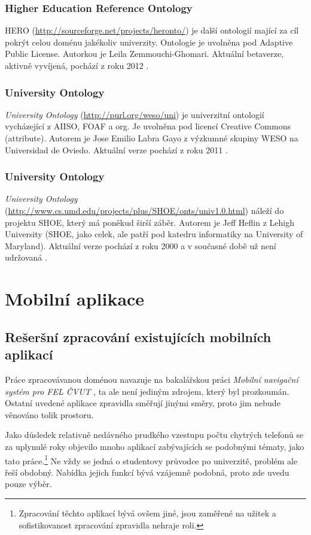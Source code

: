 \subsubsection{Higher Education Reference Ontology}
\Gls{HERO} (\url{http://sourceforge.net/projects/heronto/}) je další ontologií mající za cíl pokrýt celou doménu jakékoliv univerzity. Ontologie je uvolněna pod Adaptive Public License. Autorkou je Leila Zemmouchi-Ghomari. Aktuální betaverze, aktivně vyvíjená, pochází z roku 2012 \cite{Hero}.

\subsubsection{University Ontology}
\emph{University Ontology} (\url{http://purl.org/weso/uni}) je univerzitní ontologií vycházející z \gls{AIISO}, \gls{FOAF} a \gls{org}. Je uvolněna pod licencí Creative Commons (attribute). Autorem je Jose Emilio Labra Gayo z výzkumné skupiny WESO na Universidad de Oviedo. Aktuální verze pochází z roku 2011 \cite{Weso}.

\subsubsection{University Ontology}
\emph{University Ontology} (\url{http://www.cs.umd.edu/projects/plus/SHOE/onts/univ1.0.html}) náleží do projektu \gls{SHOE}, který má poněkud širší záběr. Autorem je Jeff Heflin z Lehigh University (\gls{SHOE}, jako celek, ale patří pod katedru informatiky na University of Maryland). Aktuální verze pochází z roku 2000 a v současné době už není udržovaná \cite{Shoe}.


\section{Mobilní aplikace}
\subsection{Rešeršní zpracování existujících mobilních aplikací}
Práce zpracovávanou doménou navazuje na bakalářskou práci \textit{Mobilní navigační systém pro FEL ČVUT} \cite{Bakalarka}, ta ale není jediným zdrojem, který byl prozkoumán. Ostatní uvedené aplikace zpravidla směřují jinými směry, proto jim nebude věnováno tolik prostoru.

Jako důsledek relativně nedávného prudkého vzestupu počtu chytrých telefonů se za uplynulé roky objevilo mnoho aplikací zabývajících se podobnými tématy, jako tato práce.\footnote{Zpracování těchto aplikací bývá ovšem jiné, jsou zaměřené na užitek a sofistikovanost zpracování zpravidla nehraje roli.} Ne vždy se jedná o studentovy průvodce po univerzitě, problém ale řeší obdobný. Nabídka jejich funkcí bývá vzájemně podobná, proto zde uvedu pouze výběr.


